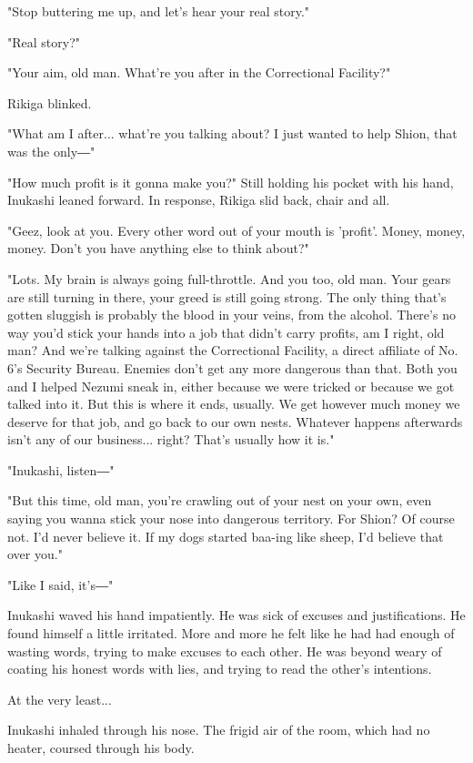 "Stop buttering me up, and let's hear your real story."

"Real story?"

"Your aim, old man. What're you after in the Correctional Facility?"

Rikiga blinked.

"What am I after... what're you talking about? I just wanted to help
Shion, that was the only―"

"How much profit is it gonna make you?" Still holding his pocket with
his hand, Inukashi leaned forward. In response, Rikiga slid back, chair
and all.

"Geez, look at you. Every other word out of your mouth is 'profit'.
Money, money, money. Don't you have anything else to think about?"

"Lots. My brain is always going full-throttle. And you too, old man.
Your gears are still turning in there, your greed is still going strong.
The only thing that's gotten sluggish is probably the blood in your
veins, from the alcohol. There's no way you'd stick your hands into a
job that didn't carry profits, am I right, old man? And we're talking
against the Correctional Facility, a direct affiliate of No. 6's
Security Bureau. Enemies don't get any more dangerous than that. Both
you and I helped Nezumi sneak in, either because we were tricked or
because we got talked into it. But this is where it ends, usually. We
get however much money we deserve for that job, and go back to our own
nests. Whatever happens afterwards isn't any of our business... right?
That's usually how it is."

"Inukashi, listen―"

"But this time, old man, you're crawling out of your nest on your own,
even saying you wanna stick your nose into dangerous territory. For
Shion? Of course not. I'd never believe it. If my dogs started baa-ing
like sheep, I'd believe that over you."

"Like I said, it's―"

Inukashi waved his hand impatiently. He was sick of excuses and
justifications. He found himself a little irritated. More and more he
felt like he had had enough of wasting words, trying to make excuses to
each other. He was beyond weary of coating his honest words with lies,
and trying to read the other's intentions.

At the very least...

Inukashi inhaled through his nose. The frigid air of the room, which had
no heater, coursed through his body.

